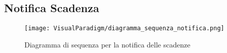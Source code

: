 \subsection{Notifica Scadenza}
\label{sec:notifica}
\begin{figure}[H]
  \centering
  \texttt{[image: VisualParadigm/diagramma\_sequenza\_notifica.png]}
  \caption{Diagramma di sequenza per la notifica delle scadenze}
  \label{fig:notifica}
\end{figure}
\clearpage
